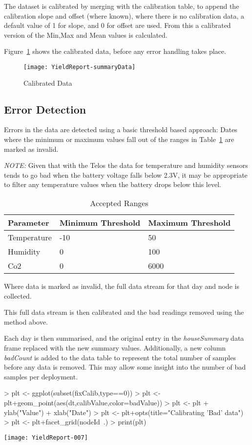 \documentclass[10pt,a4paper]{article}
\begin{document}
The dataset is calibrated by merging with the calibration table, to append the
calibration slope and offset (where known), where there is no calibration data,
a default value of 1 for slope, and 0 for offset are used.  
From this a calibrated version of the Min,Max and Mean values is calculated.


Figure~\ref{fig:calibData} shows the calibrated data, before any error handling
takes place.



\begin{figure}[ht]
\texttt{[image: YieldReport-summaryData]}
\caption{Calibrated Data}
\label{fig:calibData}
\end{figure}

\subsection{Error Detection}
Errors in the data are detected using a basic threshold based approach: Dates
where the minimum or maximum values fall out of the ranges in
Table~\ref{tab:accepted-Range} are marked as invalid.

\emph{NOTE:} Given that with the Telos the data for temperature and humidity
sensors tends to go bad when the battery voltage falls below 2.3V,  it may be
appropriate to filter any temperature values when the battery drops below this level.

\begin{table}[htbp]
\begin{tabular}{l l l}
  Parameter & Minimum Threshold & Maximum Threshold \\
  \hline
  Temperature & -10 & 50 \\
  Humidity & 0 & 100 \\
  Co2 & 0 & 6000
\end{tabular}
\caption{Accepted Ranges}
\label{tab:accepted-Range}
\end{table}


Where data is marked as invalid, the full data stream for that day and node is
collected.

This full data stream is then calibrated and the bad readings removed using the
method above.

Each day is then summarised, and the original entry in the \emph{houseSummary}
data frame replaced with the new summary values.  Additionally, a new column
\emph{badCount} is added to the data table to represent the total number of
samples before any data is removed.  This may allow some insight into the number
of bad samples per deployment.


\begin{Schunk}
\begin{Sinput}
> plt <- ggplot(subset(fixCalib,type==0))
> plt <- plt+geom_point(aes(dt,calibValue,color=badValue))
> plt <- plt + ylab("Value") + xlab("Date")
> plt <- plt+opts(title="Calibrating 'Bad' data")
> plt <- plt+facet_grid(nodeId~.)                    
> print(plt)
\end{Sinput}
\end{Schunk}
\texttt{[image: YieldReport-007]}
\end{document}
